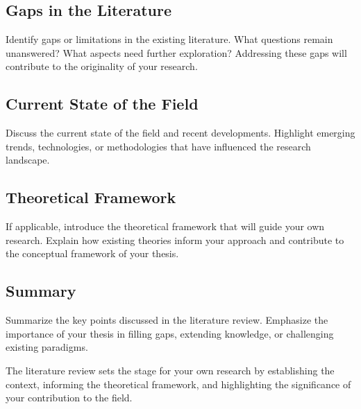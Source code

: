 \subsection{Gaps in the Literature}

Identify gaps or limitations in the existing literature. What questions remain unanswered? What aspects need further exploration? Addressing these gaps will contribute to the originality of your research.

\subsection{Current State of the Field}

Discuss the current state of the field and recent developments. Highlight emerging trends, technologies, or methodologies that have influenced the research landscape.

\subsection{Theoretical Framework}

If applicable, introduce the theoretical framework that will guide your own research. Explain how existing theories inform your approach and contribute to the conceptual framework of your thesis.

\subsection{Summary}

Summarize the key points discussed in the literature review. Emphasize the importance of your thesis in filling gaps, extending knowledge, or challenging existing paradigms.

The literature review sets the stage for your own research by establishing the context, informing the theoretical framework, and highlighting the significance of your contribution to the field.

